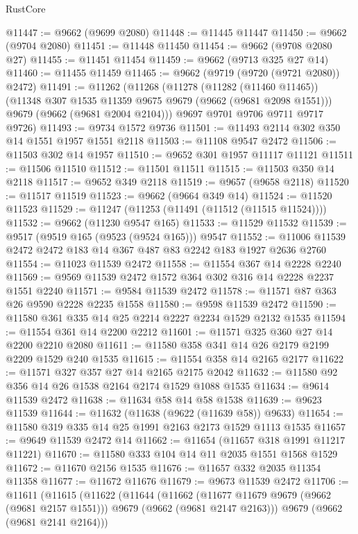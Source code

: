 \begin{lexlean}{RustCore}
\begin{coremodule}
@11447 := @9662 (@9699 @2080)
@11448 := @11445 @11447
@11450 := @9662 (@9704 @2080)
@11451 := @11448 @11450
@11454 := @9662 (@9708 @2080 @27)
@11455 := @11451 @11454
@11459 := @9662 (@9713 @325 @27 @14)
@11460 := @11455 @11459
@11465 := @9662 (@9719 (@9720 (@9721 @2080)) @2472)
@11491 := @11262
    (@11268
      (@11278
        (@11282 (@11460 @11465))
        (@11348 @307 @1535 @11359 @9675 @9679 (@9662 (@9681 @2098 @1551)))
        @9679
        (@9662 (@9681 @2004 @2104)))
      @9697
      @9701
      @9706
      @9711
      @9717
      @9726)
@11493 := @9734 @1572 @9736
@11501 := @11493 @2114 @302 @350 @14 @1551 @1957 @1551 @2118
@11503 := @11108 @9547 @2472
@11506 := @11503 @302 @14 @1957
@11510 := @9652 @301 @1957 @11117 @11121
@11511 := @11506 @11510
@11512 := @11501 @11511
@11515 := @11503 @350 @14 @2118
@11517 := @9652 @349 @2118
@11519 := @9657 (@9658 @2118)
@11520 := @11517 @11519
@11523 := @9662 (@9664 @349 @14)
@11524 := @11520 @11523
@11529 := @11247 (@11253 (@11491 (@11512 (@11515 @11524))))
@11532 := @9662 (@11230 @9547 @165)
@11533 := @11529 @11532
@11539 := @9517 (@9519 @165 (@9523 (@9524 @165))) @9547
@11552 := @11006 @11539 @2472 @2472 @183 @14 @367 @487 @83 @2242 @183 @1927 @2636 @2760
@11554 := @11023 @11539 @2472
@11558 := @11554 @367 @14 @2228 @2240
@11569 := @9569 @11539 @2472 @1572 @364 @302 @316 @14 @2228 @2237 @1551 @2240
@11571 := @9584 @11539 @2472
@11578 := @11571 @87 @363 @26 @9590 @2228 @2235 @1558
@11580 := @9598 @11539 @2472
@11590 := @11580 @361 @335 @14 @25 @2214 @2227 @2234 @1529 @2132 @1535
@11594 := @11554 @361 @14 @2200 @2212
@11601 := @11571 @325 @360 @27 @14 @2200 @2210 @2080
@11611 := @11580 @358 @341 @14 @26 @2179 @2199 @2209 @1529 @240 @1535
@11615 := @11554 @358 @14 @2165 @2177
@11622 := @11571 @327 @357 @27 @14 @2165 @2175 @2042
@11632 := @11580 @92 @356 @14 @26 @1538 @2164 @2174 @1529 @1088 @1535
@11634 := @9614 @11539 @2472
@11638 := @11634 @58 @14 @58 @1538
@11639 := @9623 @11539
@11644 := @11632 (@11638 (@9622 (@11639 @58)) @9633)
@11654 := @11580 @319 @335 @14 @25 @1991 @2163 @2173 @1529 @1113 @1535
@11657 := @9649 @11539 @2472 @14
@11662 := @11654 (@11657 @318 @1991 @11217 @11221)
@11670 := @11580 @333 @104 @14 @11 @2035 @1551 @1568 @1529
@11672 := @11670 @2156 @1535
@11676 := @11657 @332 @2035 @11354 @11358
@11677 := @11672 @11676
@11679 := @9673 @11539 @2472
@11706 := @11611
    (@11615
      (@11622
        (@11644
          (@11662
            (@11677 @11679 @9679 (@9662 (@9681 @2157 @1551)))
            @9679
            (@9662 (@9681 @2147 @2163)))
          @9679
          (@9662 (@9681 @2141 @2164)))

\end{coremodule}
\end{lexlean}
